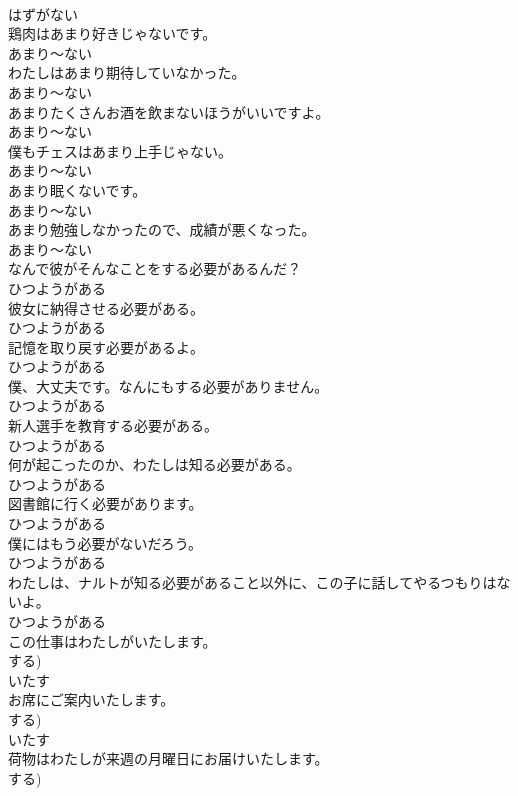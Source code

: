 \documentclass[8pt]{extreport}
\begin{document}
\begin{CJK}{UTF8}{min}
\\	はずがない	
\\	鶏肉はあまり好きじゃないです。	
\\	あまり～ない	
\\	わたしはあまり期待していなかった。	
\\	あまり～ない	
\\	あまりたくさんお酒を飲まないほうがいいですよ。	
\\	あまり～ない	
\\	僕もチェスはあまり上手じゃない。	
\\	あまり～ない	
\\	あまり眠くないです。	
\\	あまり～ない	
\\	あまり勉強しなかったので、成績が悪くなった。	
\\	あまり～ない	
\\	なんで彼がそんなことをする必要があるんだ？	
\\	ひつようがある	
\\	彼女に納得させる必要がある。	
\\	ひつようがある	
\\	記憶を取り戻す必要があるよ。	
\\	ひつようがある	
\\	僕、大丈夫です。なんにもする必要がありません。	
\\	ひつようがある	
\\	新人選手を教育する必要がある。	
\\	ひつようがある	
\\	何が起こったのか、わたしは知る必要がある。	
\\	ひつようがある	
\\	図書館に行く必要があります。	
\\	ひつようがある	
\\	僕にはもう必要がないだろう。	
\\	ひつようがある	
\\	わたしは、ナルトが知る必要があること以外に、この子に話してやるつもりはないよ。	
\\	ひつようがある	
\\	この仕事はわたしがいたします。	
\\	する)	
\\	いたす	
\\	お席にご案内いたします。	
\\	する)	
\\	いたす	
\\	荷物はわたしが来週の月曜日にお届けいたします。	
\\	する)	

\end{CJK}
\end{document}
